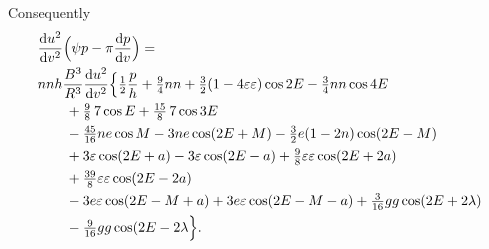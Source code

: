 \noindent Consequently
\[
\begin{aligned}
&\frac{\mathrm du^2}{\mathrm dv^2}
 \Bigl(\psi p-\pi\frac{\mathrm dp}{\mathrm dv}\Bigr)=\\
&nnh\frac{B^3}{R^3}\frac{\mathrm du^2}{\mathrm dv^2}
 \Bigl\{\tfrac12\frac{p}{h}+\tfrac94nn
 +\tfrac32(1-4\varepsilon\varepsilon)\cos2E-\tfrac34nn\cos4E\\
&\qquad+\tfrac98\,7\cos E+\tfrac{15}{8}\,7\cos3E\\
&\qquad-\tfrac{45}{16}ne\cos M-3ne\cos(2E+M)
 -\tfrac32e(1-2n)\cos(2E-M)\\
&\qquad+3\varepsilon\cos(2E+a)-3\varepsilon\cos(2E-a)
 +\tfrac98\varepsilon\varepsilon\cos(2E+2a)\\
&\qquad+\tfrac{39}{8}\varepsilon\varepsilon\cos(2E-2a)\\
&\qquad-3e\varepsilon\cos(2E-M+a)+3e\varepsilon\cos(2E-M-a)
 +\tfrac{3}{16}gg\cos(2E+2\lambda)\\
&\qquad-\tfrac{9}{16}gg\cos(2E-2\lambda\Bigr\}.
\end{aligned}
\]
\endgroup
